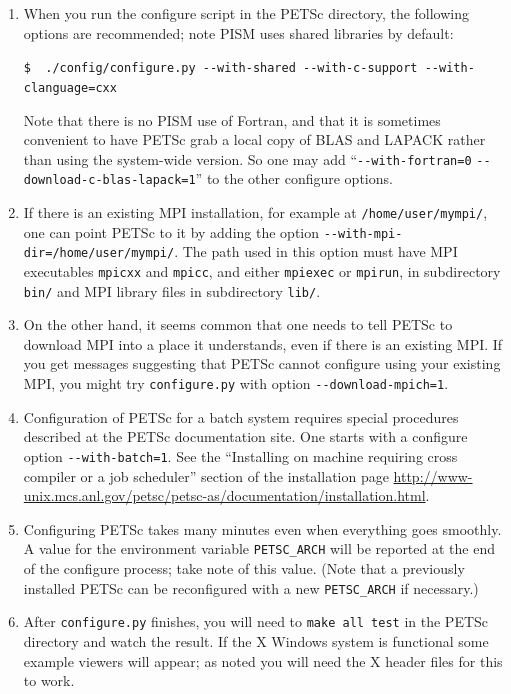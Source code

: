 \documentclass[11pt,final]{amsart}
\begin{document}
\begin{enumerate}
\begin{enumerate}
\item When you run the configure script in the PETSc directory, the following options are recommended; note PISM uses shared libraries by default:

\verb|$  ./config/configure.py --with-shared --with-c-support --with-clanguage=cxx|

Note that there is no PISM use of Fortran, and that it is sometimes convenient to have PETSc grab a local copy of BLAS and LAPACK rather than using the system-wide version.  So one may add ``\verb|--with-fortran=0| \verb|--download-c-blas-lapack=1|'' to the other configure options.

\item If there is an existing MPI installation, for example at \verb|/home/user/mympi/|, one can point PETSc to it by adding the option \verb|--with-mpi-dir=/home/user/mympi/|.  The path used in this option must have MPI executables \verb|mpicxx| and \verb|mpicc|, and either \verb|mpiexec| or \verb|mpirun|, in subdirectory \verb|bin/| and MPI library files in subdirectory \verb|lib/|.

\item On the other hand, it seems common that one needs to tell PETSc to download MPI into a place it understands, even if there is an existing MPI.  If you get messages suggesting that PETSc cannot configure using your existing MPI, you might try \verb|configure.py| with option \verb|--download-mpich=1|.

\item Configuration of PETSc for a batch system requires special procedures described at the PETSc documentation site.  One starts with a configure option \verb|--with-batch=1|.  See the ``Installing on machine requiring cross compiler or a job scheduler'' section of the installation page \url{http://www-unix.mcs.anl.gov/petsc/petsc-as/documentation/installation.html}.

\item  Configuring PETSc takes many minutes even when everything goes smoothly.   A value for the environment variable \verb|PETSC_ARCH| will be reported at the end of the configure process; take note of this value.  (Note that a previously installed PETSc can be reconfigured with a new \verb|PETSC_ARCH| if necessary.)

\item  After \verb|configure.py| finishes, you will need to \verb|make all test| in the PETSc directory and watch the result.  If the X Windows system is functional some example viewers will appear; as noted you will need the X header files for this to work.


\end{enumerate}
\end{enumerate}
\end{document}
